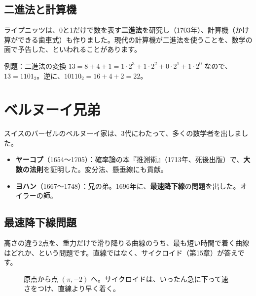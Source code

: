 \documentclass[a4paper,11pt,openany]{ltjsbook}
\begin{document}
\subsection{二進法と計算機}

ライプニッツは、0と1だけで数を表す\textbf{二進法}を研究し（1703年）、計算機（かけ算ができる歯車式）も作りました。現代の計算機が二進法を使うことを、数学の面で予告した、といわれることがあります。

\begin{examplebox}{例題：二進法の変換}
$13=8+4+1=1\cdot2^3+1\cdot2^2+0\cdot2^1+1\cdot2^0$ なので、$13=1101_2$。逆に、$10110_2=16+4+2=22$。
\end{examplebox}

\section{ベルヌーイ兄弟}

スイスのバーゼルのベルヌーイ家は、3代にわたって、多くの数学者を出しました。

\begin{itemize}[leftmargin=*]
\item \textbf{ヤーコプ}（1654〜1705）：確率論の本『推測術』（1713年、死後出版）で、\textbf{大数の法則}を証明した。変分法、懸垂線にも貢献。
\item \textbf{ヨハン}（1667〜1748）：兄の弟。1696年に、\textbf{最速降下線}の問題を出した。オイラーの師。
\end{itemize}

\subsection{最速降下線問題}

高さの違う2点を、重力だけで滑り降りる曲線のうち、最も短い時間で着く曲線はどれか、という問題です。直線ではなく、サイクロイド（第15章）が答えです。

\begin{figure}[htbp]
\centering
{}
\caption{原点から点 $(\pi,-2)$ へ。サイクロイドは、いったん急に下って速さをつけ、直線より早く着く。}
\end{figure}
\end{document}
